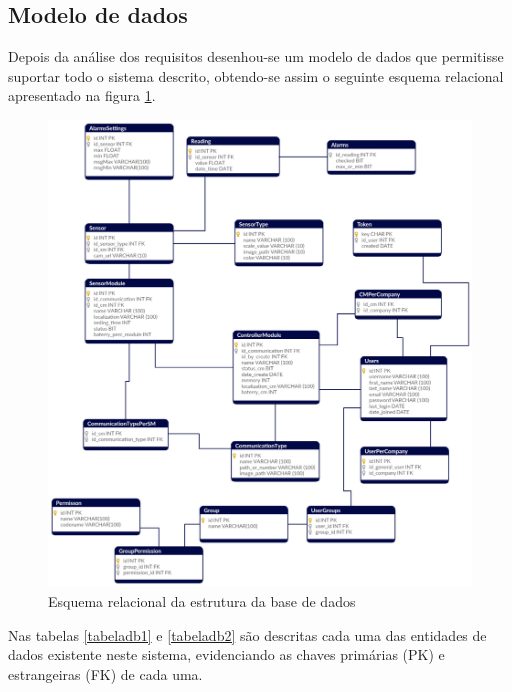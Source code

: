 \newpage
\subsection{Modelo de dados}
\label{modelocap}

Depois da análise dos requisitos desenhou-se um modelo de dados que permitisse suportar todo o sistema descrito, obtendo-se assim o seguinte esquema relacional apresentado na figura \ref{esquemarelacional}.





\begin{figure}[!htb]
	\centering
	\includegraphics[width=0.9\linewidth]{esquemas/database_tese.pdf}
	\caption{Esquema relacional da estrutura da base de dados}
	\label{esquemarelacional}
\end{figure}


Nas tabelas \ref{tabeladb1} e \ref{tabeladb2} são descritas cada uma das entidades de dados existente neste sistema, evidenciando as chaves primárias (\ac{PK}) e estrangeiras (\ac{FK}) de cada uma. 



